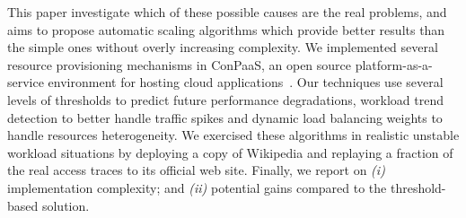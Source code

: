 This paper investigate which of these possible causes are the real
problems, and aims to propose automatic scaling algorithms which
provide better results than the simple ones without overly increasing
complexity.
We implemented several resource provisioning mechanisms in ConPaaS, an
open source platform-as-a-service environment for hosting cloud
applications~\cite{conpaasIC}. Our techniques use several levels of
thresholds to predict future performance degradations, workload trend
detection to better handle traffic spikes and dynamic load balancing
weights to handle resources heterogeneity. We exercised these
algorithms in realistic unstable workload situations by deploying a
copy of Wikipedia and replaying a fraction of the real access traces
to its official web site. Finally, we report on \emph{(i)}
implementation complexity; and \emph{(ii)} potential gains compared to
the threshold-based solution. 



